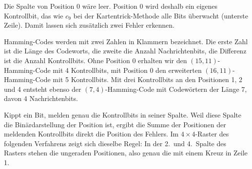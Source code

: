 Die Spalte von Position 0 wäre leer. Position 0 wird deshalb ein
eigenes Kontrollbit, das wie \(c_9\) bei der Kartentrick-Methode
alle Bits überwacht (unterste Zeile). Damit lassen sich zusätzlich
zwei Fehler erkennen.

Hamming-Codes werden mit zwei Zahlen in Klammern bezeichnet. Die erste
Zahl ist die Länge des Codeworts, die zweite die Anzahl Nachrichtenbits,
die Differenz ist die Anzahl Kontrollbits. Ohne Position 0 erhalten wir
den \((15,11)\)-Hamming-Code mit 4 Kontrollbits, mit Position 0 den
erweiterten \((16,11)\)-Hamming-Code mit 5 Kontrollbits. Mit drei
Kontrollbits an den Positionen 1, 2 und 4 entsteht ebenso der
\((7,4)\)-Hamming-Code mit Codewörtern der Länge 7, davon
4 Nachrichtenbits.

Kippt ein Bit, melden genau die Kontrollbits in seiner Spalte.
Weil diese Spalte die Binärdarstellung der Position ist, ergibt die
Summe der Positionen der meldenden Kontrollbits direkt die Position
des Fehlers. Im \(4\times 4\)-Raster des folgenden Verfahrens zeigt
sich dieselbe Regel: In der 2.\ und 4.\ Spalte des Rasters stehen
die ungeraden Positionen, also genau die mit einem Kreuz in Zeile 1.

